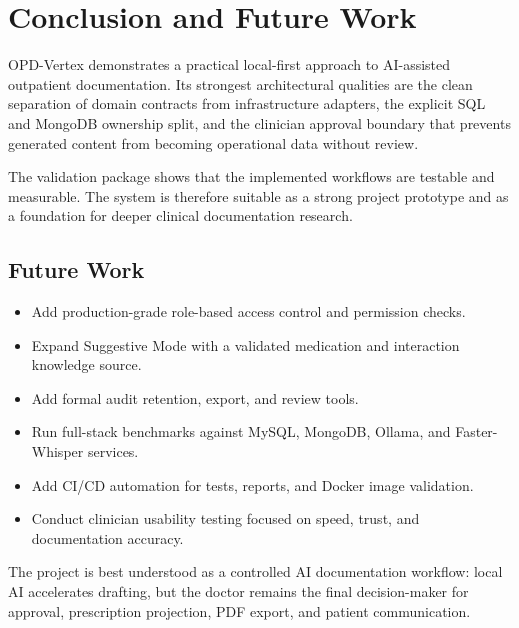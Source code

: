 \section{Conclusion and Future Work}

OPD-Vertex demonstrates a practical local-first approach to AI-assisted outpatient documentation. Its strongest architectural qualities are the clean separation of domain contracts from infrastructure adapters, the explicit SQL and MongoDB ownership split, and the clinician approval boundary that prevents generated content from becoming operational data without review.

The validation package shows that the implemented workflows are testable and measurable. The system is therefore suitable as a strong project prototype and as a foundation for deeper clinical documentation research.

\subsection{Future Work}

\begin{itemize}
  \item Add production-grade role-based access control and permission checks.
  \item Expand Suggestive Mode with a validated medication and interaction knowledge source.
  \item Add formal audit retention, export, and review tools.
  \item Run full-stack benchmarks against MySQL, MongoDB, Ollama, and Faster-Whisper services.
  \item Add CI/CD automation for tests, reports, and Docker image validation.
  \item Conduct clinician usability testing focused on speed, trust, and documentation accuracy.
\end{itemize}

\begin{summarybox}
The project is best understood as a controlled AI documentation workflow: local AI accelerates drafting, but the doctor remains the final decision-maker for approval, prescription projection, PDF export, and patient communication.
\end{summarybox}